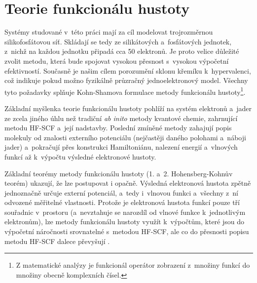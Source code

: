 \documentclass[
digital, %
table,   %
nolof,     %
nolot,     %
oneside,
]{fithesis3}
\begin{document}
\section{Teorie funkcionálu hustoty}
Systémy studované v~této práci mají za cíl modelovat trojrozměrnou silikofosfátovou síť. Skládají se tedy ze silikátových a~fosfátových jednotek, z~nichž na každou jednotku připadá cca 50 elektronů. Je proto velice důležité zvolit metodu, která bude spojovat vysokou přesnost s~vysokou výpočetní efektivností. Současně je našim cílem porozumění sklonu křemíku k~hypervalenci, což indikuje pokud možno fyzikálně průzračný jednoelektronový model. Všechny tyto požadavky splňuje Kohn-Shamova formulace metody funkcionálu hustoty\footnote{Z matematické analýzy je funkcionál operátor zobrazení z~množiny funkcí do množiny obecně komplexních čísel.}\cite{Bickelhauptdftreview}.

Základní myšlenka teorie funkcionálu hustoty pohlíží na systém elektronů a~jader ze zcela jiného úhlu než tradiční \textit{ab inito} metody kvantové chemie, zahrnující metodu HF-SCF a~její nadstavby. Poslední zmíněné metody zahajují popis molekuly od znalosti externího potenciálu (nejčastěji daného polohami a~náboji jader) a~pokračují přes konstrukci Hamiltoniánu, nalezení energií a~vlnových funkcí až k~výpočtu výsledné elektronové hustoty.

Základní teorémy metody funkcionálu hustoty (1. a~2. Hohensberg-Kohnův teorém) ukazují, že lze postupovat i opačně. Výsledná elektronová hustota zpětně jednoznačně určuje externí potenciál, a~tedy i~vlnovou funkci a~všechny z~ní odvozené měřitelné vlastnosti. Protože je elektronová hustota funkcí pouze tří souřadnic v~prostoru (a~nevztahuje se narozdíl od vlnové funkce k~jednotlivým elektronům), lze metody funkcionálu hustoty využít k~výpočtům, které jsou do výpočetní náročnosti srovnatelné s~metodou HF-SCF, ale co do přesnosti popisu metodu HF-SCF dalece převyšují \cite{jensen2007introduction}.\\
\end{document}
